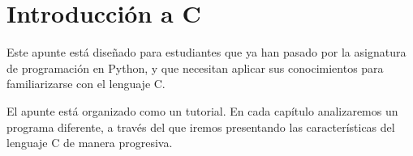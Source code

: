 \chapter{Introducción a C}

Este apunte está diseñado para estudiantes que ya han pasado por la
asignatura de programación en Python, y que necesitan aplicar sus
conocimientos para familiarizarse con el lenguaje C.

El apunte está organizado como un tutorial. En cada capítulo
analizaremos un programa diferente, a través del que iremos presentando
las características del lenguaje C de manera progresiva.
